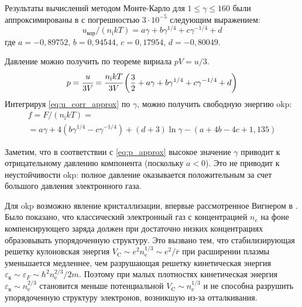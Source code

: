 Результаты вычислений методом Монте-Карло для $1 \leq \gamma \leq 160$ были аппроксимированы в \cite{Slattery:u_corr_approximation} с погрешностью $3 \cdot 10^{-5}$ следующим выражением:
\begin{equation}
    \label{eq:u_corr_approx}
    u_{\text{кор}} /\left(n_{\mathrm{i}} k T\right)=a \gamma+b \gamma^{1 / 4}+c \gamma^{-1 / 4}+d
\end{equation}
где $a=-0,89752$, $b=0,94544$, $c=0,17954$, $d=-0,80049$.

Давление можно получить по теореме вириала $p V = u/3$.
\begin{equation}
    \label{eq:p_approx}
    p = \cfrac{u}{3V}
    = \cfrac{n_\mathrm{i} kT}{3V} \left( \frac{3}{2} 
    + a \gamma + b \gamma^{1/4} + c \gamma^{-1/4} + d \right)
\end{equation}
Интегрируя \eqref{eq:u_corr_approx} по $\gamma$, можно получить свободную энергию \acrshort{okp}:
\begin{multline}
    \label{eq:f-density-gas-approx}
    f=F /\left(n_{\mathrm{i}} k T\right) = \\
    =a \gamma+4\left(b \gamma^{1 / 4}-c \gamma^{-1 / 4}\right)+(d+3) \ln \gamma-(a+4 b-4 c+1,135)
\end{multline}

Заметим, что в соответствии с \eqref{eq:p_approx} высокое значение $\gamma$ приводит к отрицательному давлению компонента (поскольку $a < 0$).
Это не приводит к неустойчивости \acrshort{okp}: полное давление оказывается положительным за счет большого давления электронного газа.

Для \acrshort{okp} возможно явление кристаллизации, впервые рассмотренное Вигнером в \cite{Wigner:plasma_condensation}.
Было показано, что классический электронный газ с концентрацией $n_e$ на фоне компенсирующего заряда должен при достаточно низких концентрациях образовывать упорядоченную структуру.
Это вызвано тем, что стабилизирующая решетку кулоновская энергия $V_{\mathrm{C}} \sim e^{2} n_{\mathrm{e}}^{1 / 3} \sim e^{2} / \bar{r}$ при расширении плазмы уменьшается медленнее, чем разрушающая решетку кинетическая энергия $\varepsilon_\text{к} \sim \varepsilon_{F} \sim \hbar^{2} n_{\mathrm{e}}^{2 / 3} / 2 m$.
Поэтому при малых плотностях кинетическая энергия $\varepsilon_\text{к} \sim n_{\mathrm{e}}^{2 / 3}$ становится меньше потенциальной $V_{\mathrm{C}} \sim n_{\mathrm{e}}^{1 / 3}$ и не способна разрушить упорядоченную структуру электронов, возникшую из-за отталкивания.


